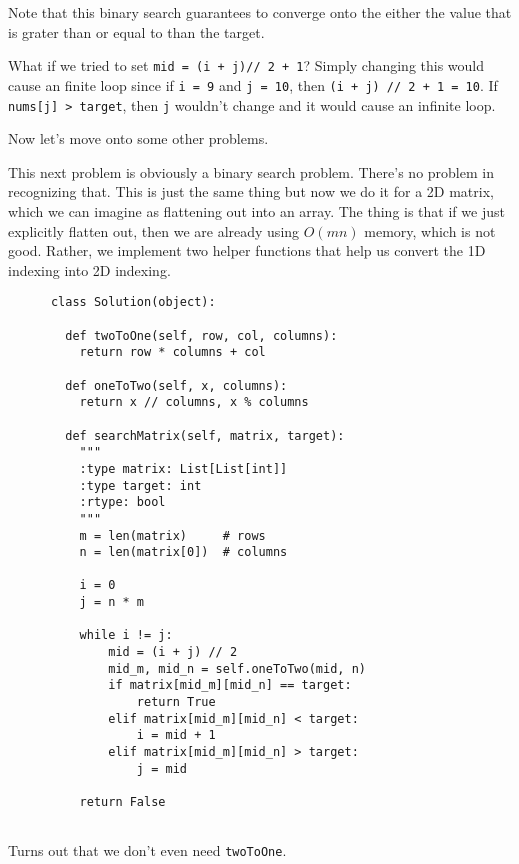 \documentclass{article}
\begin{document}
  Note that this binary search guarantees to converge onto the either the value that is grater than or equal to than the target. 

  What if we tried to set \texttt{mid = (i + j)// 2 + 1}? Simply changing this would cause an finite loop since if \texttt{i = 9} and \texttt{j = 10}, then \texttt{(i + j) // 2 + 1 = 10}. If \texttt{nums[j] > target}, then \texttt{j} wouldn't change and it would cause an infinite loop.  

  Now let's move onto some other problems. 

  \begin{example}

    This next problem is obviously a binary search problem. There's no problem in recognizing that. This is just the same thing but now we do it for a 2D matrix, which we can imagine as flattening out into an array. The thing is that if we just explicitly flatten out, then we are already using $O(mn)$ memory, which is not good. Rather, we implement two helper functions that help us convert the 1D indexing into 2D indexing. 
    \begin{lstlisting}
      class Solution(object):

        def twoToOne(self, row, col, columns): 
          return row * columns + col

        def oneToTwo(self, x, columns): 
          return x // columns, x % columns

        def searchMatrix(self, matrix, target):
          """
          :type matrix: List[List[int]]
          :type target: int
          :rtype: bool
          """
          m = len(matrix)     # rows
          n = len(matrix[0])  # columns 

          i = 0
          j = n * m 

          while i != j: 
              mid = (i + j) // 2 
              mid_m, mid_n = self.oneToTwo(mid, n) 
              if matrix[mid_m][mid_n] == target: 
                  return True 
              elif matrix[mid_m][mid_n] < target: 
                  i = mid + 1 
              elif matrix[mid_m][mid_n] > target: 
                  j = mid 
          
          return False
          
      \end{lstlisting}

      Turns out that we don't even need \texttt{twoToOne}. 
  \end{example}
\end{document}
